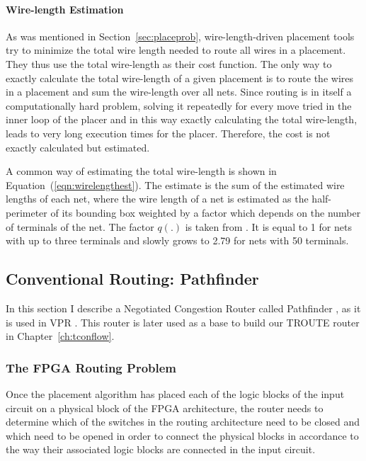 \documentclass[a4paper,oneside,12pt]{article}
\begin{document}
\paragraph{Wire-length Estimation}
\label{sec:wireLengthEstimation}
As was mentioned in Section~\ref{sec:placeprob}, wire-length-driven placement tools try to minimize the total wire length needed to route all wires in a placement. They thus use the total wire-length as their cost function. The only way to exactly calculate the total wire-length of a given placement is to route the wires in a placement and sum the wire-length over all nets. Since routing is in itself a computationally hard problem, solving it repeatedly for every move tried in the inner loop of the placer and in this way exactly calculating the total wire-length, leads to very long execution times for the placer. Therefore, the cost is not exactly calculated but estimated.

A common way of estimating the total wire-length is shown in Equation~(\ref{eqn:wirelengthest}). The estimate is the sum of the estimated wire lengths of each net, where the wire length of a net is estimated as the half-perimeter of its bounding box weighted by a factor which depends on the number of terminals of the net. The factor $q(.)$ is taken from \cite{cheng1994raaeprm}. It is equal to 1 for nets with up to three terminals and slowly grows to 2.79 for nets with 50 terminals.

\subsection{Conventional Routing: Pathfinder}
\label{sec:confroute}
In this section I describe a Negotiated Congestion Router called Pathfinder \cite{mcmurchie1995panprff}, as it is used in VPR \cite{betz1997vanppartffr,betz1999aacfdf}. This router is later used as a base to build our TROUTE router in Chapter~\ref{ch:tconflow}.

\subsubsection{The FPGA Routing Problem}
Once the placement algorithm has placed each of the logic blocks of the input circuit on a physical block of the FPGA architecture, the router needs to determine which of the switches in the routing architecture need to be closed and which need to be opened in order to connect the physical blocks in accordance to the way their associated logic blocks are connected in the input circuit.
\end{document}
